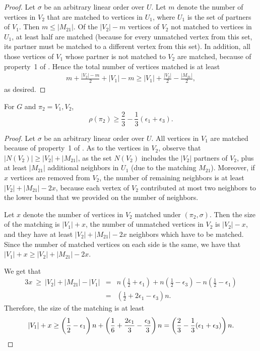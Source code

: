 \documentclass{toc}
\theoremstyle{plain}
\begin{document}
\begin{proof}
	Let $\sigma$ be an arbitrary linear order over $U$. Let $m$ denote the number of vertices in $V_2$ that are matched to vertices in $U_1$, where $U_1$ is the set of partners of $V_1$.
	Then $m \le |M_{21}|$. Of the $|V_2| - m$ vertices of $V_2$ not matched to vertices in $U_1$, at least half are matched (because for every unmatched vertex from this set, its partner must be matched to a different vertex from this set). In addition, all those vertices of $V_1$ whose partner is not matched to $V_2$ are matched, because of property~1 of . Hence the total number of vertices matched is at least 
	\begin{eqnarray}
m + \frac{|V_2| - m}{2} + |V_1| - m \ge |V_1|+\frac{|V_2|}{2} - \frac{|M_{21}|}{2},
	\end{eqnarray}
	as desired.
\end{proof}

\begin{lemma}
	\label{lem:largeM21}
	For $G$ and $\pi_2 = V_1,V_2$,
$$\rho(\pi_2) \ge \frac{2}{3} - \frac{1}{3}(\epsilon_1 + \epsilon_3).$$
\end{lemma}

\begin{proof}
	Let $\sigma$ be an arbitrary linear order over $U$. All vertices in $V_1$ are matched because of property~1 of . As to the vertices in $V_2$, observe that $|N(V_2)| \ge |V_2| + |M_{21}|$, as the set $N(V_2)$ includes the $|V_2|$ partners of $V_2$, plus at least $|M_{21}|$ additional neighbors in $U_1$ (due to the matching $M_{21}$). Moreover, if $x$ vertices are removed from $V_2$, the number of remaining neighbors is at least $|V_2| + |M_{21}| - 2x$, because each vertex of $V_2$ contributed at most two neighbors to the lower bound that we provided on the number of neighbors.
	
	Let $x$ denote the number of vertices in $V_2$ matched under $(\pi_2,\sigma)$.
	Then the size of the matching is $|V_1| + x$, the number of unmatched vertices in $V_2$ is $|V_2|-x$, and they have at least $|V_2| + |M_{21}| - 2x$ neighbors which have to be matched. Since the number of matched vertices on each side is the same, %
	we have that $|V_1| + x \ge |V_2| + |M_{21}| - 2x$.
	
	
	We get that
	\begin{eqnarray}
		3x \  \geq \  |V_2|+|M_{21}|-|V_1|
		& = & n\left(\frac{1}{2}+\epsilon_1\right)+n\left(\frac{1}{2}-\epsilon_3\right)-n\left(\frac{1}{2}-\epsilon_1\right)\\
		& = & \left(\frac{1}{2} + 2\epsilon_1 - \epsilon_3\right)n.
	\end{eqnarray}
	Therefore, the size of the matching is at least
	\begin{eqnarray}
	|V_1| + x \geq \left( \frac{1}{2} - \epsilon_1\right)n + \left(\frac{1}{6} + \frac{2\epsilon_1}{3} - \frac{\epsilon_3}{3}\right)n = \left(\frac{2}{3} - \frac{1}{3}(\epsilon_1 + \epsilon_3)\right) n.    \qedhere
	\end{eqnarray}
\end{proof}
\end{document}
